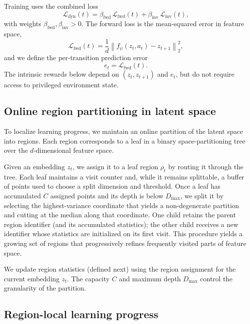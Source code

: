 Training uses the combined loss
\begin{equation}
    \mathcal{L}_{\mathrm{dyn}}(t) = \beta_{\mathrm{fwd}}\,\mathcal{L}_{\mathrm{fwd}}(t) + \beta_{\mathrm{inv}}\,\mathcal{L}_{\mathrm{inv}}(t),
\end{equation}
with weights $\beta_{\mathrm{fwd}},\beta_{\mathrm{inv}}>0$.
The forward loss is the mean-squared error in feature space,
\begin{equation}
    \mathcal{L}_{\mathrm{fwd}}(t) = \frac{1}{d}\left\lVert f_\psi(z_t,a_t) - z_{t+1} \right\rVert_2^2,
\end{equation}
and we define the per-transition prediction error
\begin{equation}
    e_t = \mathcal{L}_{\mathrm{fwd}}(t).
\end{equation}
The intrinsic rewards below depend on $(z_t,z_{t+1})$ and $e_t$, but do not require access to privileged environment state.

\subsection{Online region partitioning in latent space}

To localize learning progress, we maintain an online partition of the latent space into regions.
Each region corresponds to a leaf in a binary space-partitioning tree over the $d$-dimensional feature space.

Given an embedding $z_t$, we assign it to a leaf region $\rho_t$ by routing it through the tree.
Each leaf maintains a visit counter and, while it remains splittable, a buffer of points used to choose a split dimension and threshold.
Once a leaf has accumulated $C$ assigned points and its depth is below $D_{\max}$, we split it by selecting the highest-variance coordinate that yields a non-degenerate partition and cutting at the median along that coordinate.
One child retains the parent region identifier (and its accumulated statistics); the other child receives a new identifier whose statistics are initialized on its first visit.
This procedure yields a growing set of regions that progressively refines frequently visited parts of feature space.

We update region statistics (defined next) using the region assignment for the current embedding $z_t$.
The capacity $C$ and maximum depth $D_{\max}$ control the granularity of the partition.

\subsection{Region-local learning progress}

